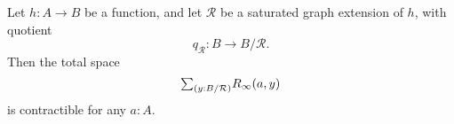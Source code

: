 \begin{comment}
The type of sequences of abstract graph extensions can be presented as the coinductive type
\begin{equation*}
\mathsf{seq}(B,h,\mathcal{R})\to\sm{(B',h',\mathcal{S}):\mathsf{gphExt}}{(i,H,\epsilon):(B,h,\mathcal{R})\to(B',h',\mathcal{S})}\mathsf{seq}(B',h',\mathcal{S}).
\end{equation*}
We use the following lemma to conclude that the map
\begin{equation*}
\mathsf{sat}(\mathcal{R})\to\mathsf{seq}(B,h,\mathcal{R})
\end{equation*}
is an embedding.

\begin{lem}
The map
\begin{equation*}
\varphi:\mathsf{presat}(\mathcal{R})\to \sm{(B',h',\mathcal{S}):\mathsf{gphExt}}(B,h,\mathcal{R})\to(B',h',\mathcal{S})
\end{equation*}
given by
\begin{equation*}
\cdots
\end{equation*}
is an embedding.
\end{lem}

\begin{proof}
Let $(i,H,\alpha):(B,h,\mathcal{R})\to(B',h',\mathcal{R}')$, and suppose that the fiber of $\varphi$ at $(B',h',\mathcal{R}',i,H,\alpha)$ is merely inhabited. 
\end{proof}

\begin{cor}
The map
\begin{equation*}
\mathsf{sat}(\mathcal{R})\to\mathsf{seq}(B,h,\mathcal{R})
\end{equation*}
defined in \autoref{defn:seq_sat} is an embedding.
\end{cor}
\end{comment}

\begin{prp}
Let $h:A\to B$ be a function, and let $\mathcal{R}$ be a saturated graph extension of $h$, with quotient
\begin{equation*}
q_{\mathcal{R}}:B\to B/\mathcal{R}.
\end{equation*}
Then the total space
\begin{equation*}
\sm{y:B/\mathcal{R}}R_\infty(a,y)
\end{equation*}
is contractible for any $a:A$.
\end{prp}

